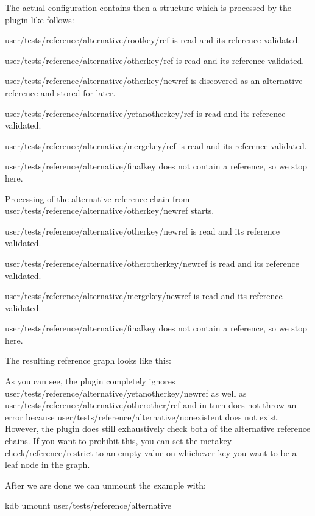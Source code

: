 The actual configuration contains then a structure which is processed by the plugin like follows\+:


\begin{DoxyEnumerate}
\item {\ttfamily user/tests/reference/alternative/rootkey/ref} is read and its reference validated.
\item {\ttfamily user/tests/reference/alternative/otherkey/ref} is read and its reference validated.
\item {\ttfamily user/tests/reference/alternative/otherkey/newref} is discovered as an alternative reference and stored for later.
\item {\ttfamily user/tests/reference/alternative/yetanotherkey/ref} is read and its reference validated.
\item {\ttfamily user/tests/reference/alternative/mergekey/ref} is read and its reference validated.
\item {\ttfamily user/tests/reference/alternative/finalkey} does not contain a reference, so we stop here.
\item Processing of the alternative reference chain from {\ttfamily user/tests/reference/alternative/otherkey/newref} starts.
\item {\ttfamily user/tests/reference/alternative/otherkey/newref} is read and its reference validated.
\item {\ttfamily user/tests/reference/alternative/otherotherkey/newref} is read and its reference validated.
\item {\ttfamily user/tests/reference/alternative/mergekey/newref} is read and its reference validated.
\item {\ttfamily user/tests/reference/alternative/finalkey} does not contain a reference, so we stop here.
\end{DoxyEnumerate}

The resulting reference graph looks like this\+:



As you can see, the plugin completely ignores {\ttfamily user/tests/reference/alternative/yetanotherkey/newref} as well as {\ttfamily user/tests/reference/alternative/otherother/ref} and in turn does not throw an error because {\ttfamily user/tests/reference/alternative/nonexistent} does not exist. However, the plugin does still exhaustively check both of the alternative reference chains. If you want to prohibit this, you can set the metakey {\ttfamily check/reference/restrict} to an empty value on whichever key you want to be a leaf node in the graph.

After we are done we can unmount the example with\+:


\begin{DoxyCode}
kdb umount user/tests/reference/alternative
\end{DoxyCode}
 